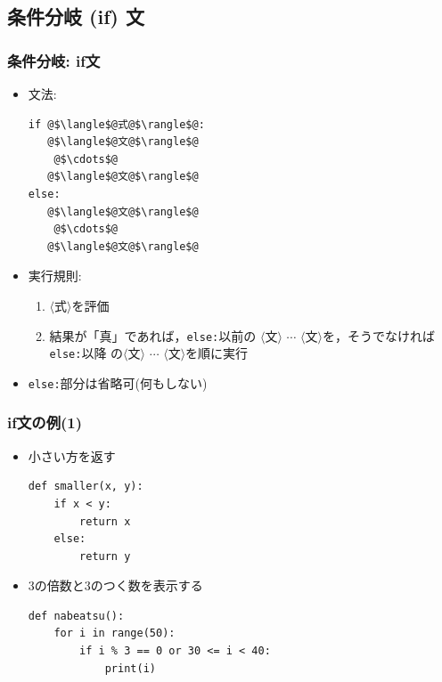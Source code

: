 \documentclass[10pt,dvipdfmx]{beamer}
\begin{document}
\subsection{条件分岐 (if) 文}

\begin{frame}[fragile]
\frametitle{条件分岐: if文}
\begin{itemize}
\item 文法:
\begin{lstlisting}
if @$\langle$@式@$\rangle$@:
   @$\langle$@文@$\rangle$@
    @$\cdots$@
   @$\langle$@文@$\rangle$@
else:
   @$\langle$@文@$\rangle$@
    @$\cdots$@
   @$\langle$@文@$\rangle$@
\end{lstlisting}
\item 実行規則:
  \begin{enumerate}
  \item $\langle$式$\rangle$を評価
  \item 結果が「真」であれば，{\tt else:}以前の
    $\langle$文$\rangle$ $\cdots$
    $\langle$文$\rangle$を，そうでなければ{\tt else:}以降
    の$\langle$文$\rangle$ $\cdots$
    $\langle$文$\rangle$を順に実行
  \end{enumerate}
\item {\tt else:}部分は省略可(何もしない)
\end{itemize}
\end{frame}


\begin{frame}[fragile]
\frametitle{if文の例(1)}
\begin{itemize}
\item 小さい方を返す

\begin{lstlisting}
def smaller(x, y):
    if x < y:
        return x
    else:
        return y
\end{lstlisting}

\item 3の倍数と3のつく数を表示する
\begin{lstlisting}
def nabeatsu():
    for i in range(50):
        if i % 3 == 0 or 30 <= i < 40:
            print(i)
\end{lstlisting}
\end{itemize}
\end{frame}
\end{document}
